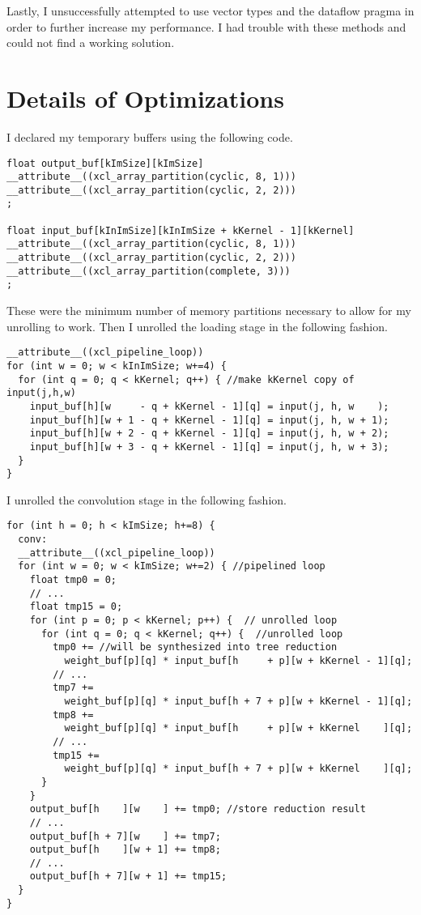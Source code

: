 \documentclass[12pt]{article}
\begin{document}
Lastly, I unsuccessfully attempted to use vector types and the dataflow pragma in order to further
increase my performance. I had trouble with these methods and could not find a working solution.

\section{Details of Optimizations}

I declared my temporary buffers using the following code.
\begin{verbatim}
float output_buf[kImSize][kImSize]
__attribute__((xcl_array_partition(cyclic, 8, 1)))
__attribute__((xcl_array_partition(cyclic, 2, 2)))
;

float input_buf[kInImSize][kInImSize + kKernel - 1][kKernel]
__attribute__((xcl_array_partition(cyclic, 8, 1)))
__attribute__((xcl_array_partition(cyclic, 2, 2)))
__attribute__((xcl_array_partition(complete, 3)))
;
\end{verbatim}
These were the minimum number of memory partitions necessary to allow for my unrolling to work.
Then I unrolled the loading stage in the following fashion.
\scriptsize
\begin{verbatim}
__attribute__((xcl_pipeline_loop))
for (int w = 0; w < kInImSize; w+=4) {
  for (int q = 0; q < kKernel; q++) { //make kKernel copy of input(j,h,w)
    input_buf[h][w     - q + kKernel - 1][q] = input(j, h, w    );
    input_buf[h][w + 1 - q + kKernel - 1][q] = input(j, h, w + 1);
    input_buf[h][w + 2 - q + kKernel - 1][q] = input(j, h, w + 2);
    input_buf[h][w + 3 - q + kKernel - 1][q] = input(j, h, w + 3);
  }
}
\end{verbatim}
\normalsize
I unrolled the convolution stage in the following fashion.
\scriptsize
\begin{verbatim}
for (int h = 0; h < kImSize; h+=8) {
  conv:
  __attribute__((xcl_pipeline_loop))
  for (int w = 0; w < kImSize; w+=2) { //pipelined loop
    float tmp0 = 0;
    // ...
    float tmp15 = 0;
    for (int p = 0; p < kKernel; p++) {  // unrolled loop
      for (int q = 0; q < kKernel; q++) {  //unrolled loop
        tmp0 += //will be synthesized into tree reduction
          weight_buf[p][q] * input_buf[h     + p][w + kKernel - 1][q];
        // ...
        tmp7 +=
          weight_buf[p][q] * input_buf[h + 7 + p][w + kKernel - 1][q];
        tmp8 +=
          weight_buf[p][q] * input_buf[h     + p][w + kKernel    ][q];
        // ...
        tmp15 +=
          weight_buf[p][q] * input_buf[h + 7 + p][w + kKernel    ][q];
      }
    }
    output_buf[h    ][w    ] += tmp0; //store reduction result
    // ...
    output_buf[h + 7][w    ] += tmp7;
    output_buf[h    ][w + 1] += tmp8;
    // ...
    output_buf[h + 7][w + 1] += tmp15;
  }
}
\end{verbatim}
\normalsize
\end{document}
